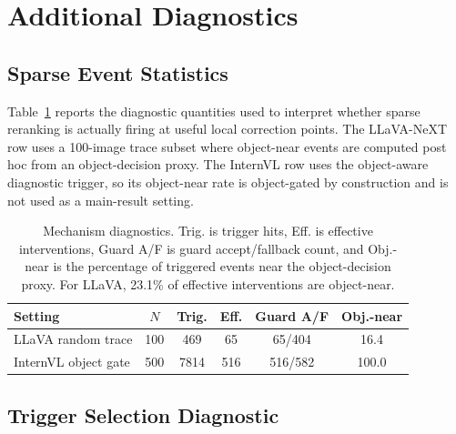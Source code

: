 \documentclass[11pt]{article}
\begin{document}
%


\clearpage
\onecolumn
\appendix

\section{Additional Diagnostics}
\label{app:additional_diagnostics}

\subsection{Sparse Event Statistics}

Table~\ref{tab:appendix_mechanism} reports the diagnostic quantities used to interpret whether sparse reranking is actually firing at useful local correction points.
The LLaVA-NeXT row uses a 100-image trace subset where object-near events are computed post hoc from an object-decision proxy.
The InternVL row uses the object-aware diagnostic trigger, so its object-near rate is object-gated by construction and is not used as a main-result setting.

\begin{table}[h]
  \centering
  \small
  \setlength{\tabcolsep}{3.2pt}
  \begin{tabular}{lccccc}
  \hline
  Setting & $N$ & Trig. & Eff. & Guard A/F & Obj.-near \\
  \hline
  LLaVA random trace & 100 & 469 & 65 & 65/404 & 16.4 \\
  InternVL object gate & 500 & 7814 & 516 & 516/582 & 100.0 \\
  \hline
  \end{tabular}
  \caption{
  Mechanism diagnostics.
  Trig. is trigger hits, Eff. is effective interventions, Guard A/F is guard accept/fallback count, and Obj.-near is the percentage of triggered events near the object-decision proxy.
  For LLaVA, 23.1\% of effective interventions are object-near.
  }
  \label{tab:appendix_mechanism}
\end{table}

\subsection{Trigger Selection Diagnostic}
\label{app:trigger_selection}
\end{document}
